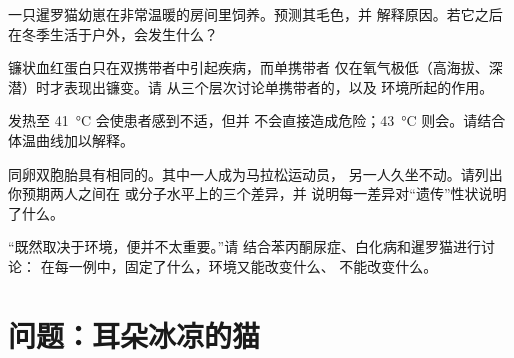 \begin{exercise}[$\star\star$]\label{exo:g11:enzymes-and-phenotype:11}
一只暹罗猫幼崽在非常温暖的房间里饲养。预测其毛色，并
解释原因。若它之后在冬季生活于户外，会发生什么？
\end{exercise}

\begin{exercise}[$\star\star\star$]\label{exo:g11:enzymes-and-phenotype:12}
镰状血红蛋白只在双携带者中引起疾病，而单携带者
仅在氧气极低（高海拔、深潜）时才表现出镰变。请
从三个层次讨论单携带者的，以及
环境所起的作用。
\end{exercise}

\begin{exercise}[$\star\star\star$]\label{exo:g11:enzymes-and-phenotype:13}
发热至 \qty{41}{\celsius} 会使患者感到不适，但并
不会直接造成危险；\qty{43}{\celsius} 则会。请结合
体温曲线加以解释。
\end{exercise}

\begin{exercise}[$\star\star\star$]\label{exo:g11:enzymes-and-phenotype:14}
同卵双胞胎具有相同的。其中一人成为马拉松运动员，
另一人久坐不动。请列出你预期两人之间在
或分子水平上的三个差异，并
说明每一差异对“遗传”性状说明了什么。
\end{exercise}

\begin{exercise}[$\star\star\star$]\label{exo:g11:enzymes-and-phenotype:15}
“既然取决于环境，便并不太重要。”请
结合苯丙酮尿症、白化病和暹罗猫进行讨论：
在每一例中，固定了什么，环境又能改变什么、
不能改变什么。
\end{exercise}

\section{问题：耳朵冰凉的猫}

